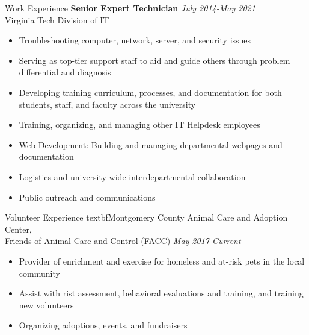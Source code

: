 \documentclass{resume} %
\begin{document}
\begin{rSection}{Work Experience}
  \textbf{Senior Expert Technician} \hfill \textit{July 2014-May 2021} \\
  Virginia Tech Division of IT
   \begin{itemize}
      \itemsep -3pt {} 
       \item Troubleshooting computer, network, server, and security issues
       \item Serving as top-tier support staff to aid and guide others through problem differential and diagnosis
       \item Developing training curriculum, processes, and documentation for both students, staff, and faculty across the university
       \item Training, organizing, and managing other IT Helpdesk employees
       \item Web Development: Building and managing departmental webpages and documentation
       \item Logistics and university-wide interdepartmental collaboration
       \item Public outreach and communications
   \end{itemize}

\end{rSection} 

\begin{rSection}{Volunteer Experience} 
    textbf{Montgomery County Animal Care and Adoption Center, \\ Friends of Animal Care and Control (FACC)} \hfill \textit{May 2017-Current}
\begin{itemize}
    \item 	Provider of enrichment and exercise for homeless and at-risk pets in the local community
    \item Assist with rist assessment, behavioral evaluations and training, and training new volunteers
    \item Organizing adoptions, events, and fundraisers
\end{itemize}

\end{rSection}
\end{document}
